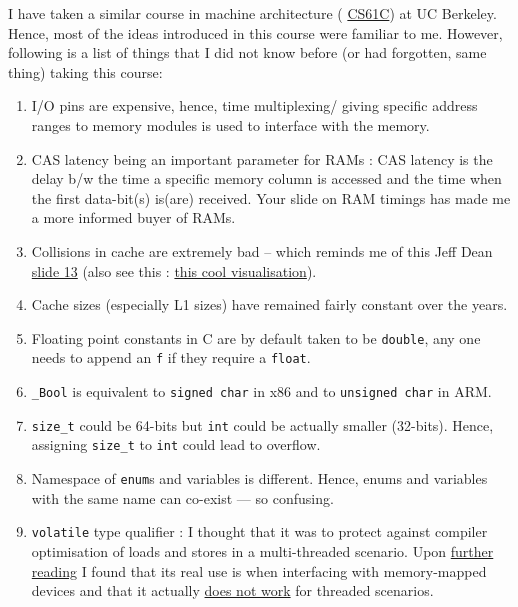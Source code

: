 \documentclass[11pt]{report}
\begin{document}
\maketitle

I have taken a similar course in machine architecture (
\href{http://inst.eecs.berkeley.edu/~cs61c}{CS61C})
at UC Berkeley. Hence, most of the ideas introduced in this course were familiar to me. However, following is a list of things that I did not know before (or had forgotten, same thing) taking this course:
\begin{enumerate}
	\item I/O pins are expensive, hence, time multiplexing/ giving specific address ranges to memory modules is used to interface with the memory.
	\item CAS latency being an important parameter for RAMs : CAS latency is the delay b/w the time a specific memory column is accessed and the time when the first data-bit(s) is(are) received. Your slide on RAM timings has made me a more informed buyer of RAMs.
	\item Collisions in cache are extremely bad -- which reminds me of this Jeff Dean \href{http://static.googleusercontent.com/media/research.google.com/en//people/jeff/stanford-295-talk.pdf}{slide 13}
	(also see this : \href{http://www.eecs.berkeley.edu/~rcs/research/interactive_latency.html}{this cool visualisation}).
	\item Cache sizes (especially L1 sizes) have remained fairly constant over the years.
	\item Floating point constants in C are by default taken to be \texttt{double}, any one needs to append an \texttt{f} if they require a \texttt{float}.
	\item \texttt{\_Bool} is equivalent to \texttt{signed char} in x86 and to \texttt{unsigned char} in ARM.
	\item \texttt{size\_t} could be 64-bits but \texttt{int} could be actually smaller (32-bits). Hence, assigning \texttt{size\_t} to \texttt{int} could lead to overflow.
	\item Namespace of \texttt{enum}s and variables is different. Hence, enums and variables with the same name can co-exist --- so confusing.
	\item \texttt{volatile} type qualifier : I thought that it was to protect against compiler optimisation of loads and stores in a multi-threaded scenario. Upon \href{http://stackoverflow.com/questions/246127/why-is-volatile-needed-in-c}{further reading} I found that its real use is when interfacing with memory-mapped devices and that it actually \href{http://en.wikipedia.org/wiki/Volatile_%28computer_programming%29}{does not work} for threaded scenarios.

\end{enumerate}
\end{document}
